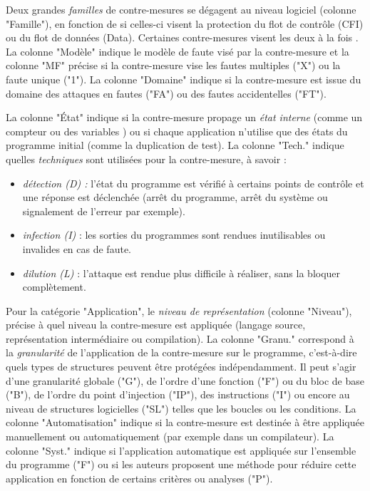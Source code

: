             Deux grandes \textit{familles} de contre-mesures se dégagent au niveau logiciel (colonne "Famille"), en fonction de si celles-ci visent la protection du flot de contrôle (CFI) ou du flot de données (Data). Certaines contre-mesures visent les deux à la fois \cite{Reis/ISCCO05}.
            La colonne "Modèle" indique le modèle de faute visé par la contre-mesure et la colonne "MF" précise si la contre-mesure vise les fautes multiples ("X") ou la faute unique ("1").
            La colonne "Domaine" indique si la contre-mesure est issue du domaine des attaques en fautes ("FA") ou des fautes accidentelles ("FT").
            
            La colonne "État" indique si la contre-mesure propage un \textit{état interne} (comme un compteur \cite{heydemann2019formally} ou des variables \cite{Reis/ISCCO05, Ferriere/LLVM19}) ou si chaque application n'utilise que des états du programme initial (comme la duplication de test).
            La colonne "Tech." indique quelles \textit{techniques} sont utilisées pour la contre-mesure, à savoir :
                \begin{itemize}
                    \item \textit{détection (D) :} l'état du programme est vérifié à certains points de contrôle et une réponse est déclenchée (arrêt du programme, arrêt du système ou signalement de l'erreur par exemple). 
                    \item \textit{infection (I)} : les sorties du programmes sont rendues inutilisables ou invalides en cas de faute.
                    \item \textit{dilution (L)} : l'attaque est rendue plus difficile à réaliser, sans la bloquer complètement.
                \end{itemize}
            
            Pour la catégorie "Application", le \textit{niveau de représentation} (colonne "Niveau"), précise à quel niveau la contre-mesure est appliquée (langage source, représentation intermédiaire ou compilation). 
            La colonne "Granu." correspond à la \textit{granularité} de l'application de la contre-mesure sur le programme, c'est-à-dire quels types de structures peuvent être protégées indépendamment. Il peut s'agir d'une granularité globale ("G"), de l'ordre d'une fonction ("F") ou du bloc de base ("B"), de l'ordre du point d'injection ("IP"), des instructions ("I") ou encore au niveau de structures logicielles ("SL") telles que les boucles ou les conditions.
            La colonne "Automatisation" indique si la contre-mesure est destinée à être appliquée manuellement ou automatiquement (par exemple dans un compilateur).
            La colonne "Syst." indique si l'application automatique est appliquée sur l'ensemble du programme \cite{lalande} ("F") ou si les auteurs proposent une méthode pour réduire cette application en fonction de certains critères ou analyses \cite{Reis/ISCCO05} ("P"). 
            
